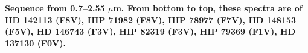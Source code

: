{\bf Sequence from 0.7–2.55 $\mu$m. From bottom to top, these spectra are of HD 142113 (F8V), HIP 71982 (F8V), HIP 78977 (F7V), HD 148153 (F5V), HD 146743 (F3V), HIP 82319 (F3V), HIP 79369 (F1V), HD 137130 (F0V).
\label{fig:stack-plot-f}}
